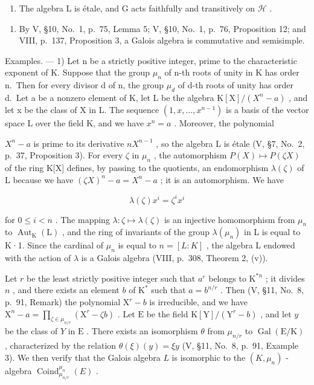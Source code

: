 \begin{enumerate}
\def\labelenumi{(\roman{enumi})}
\setcounter{enumi}{6}
\tightlist
\item
  The algebra \(\mathrm{L}\) is étale, and \(\mathrm{G}\) acts faithfully and transitively on \(\mathcal{H}\) .
\end{enumerate}

\begin{enumerate}
\def\labelenumi{\arabic{enumi})}
\setcounter{enumi}{5}
\tightlist
\item
  By V, §10, No.~1, p.~75, Lemma 5; V, §10, No.~1, p.~76, Proposition 12; and VIII, p.~137, Proposition 3, a Galois algebra is commutative and semisimple.
\end{enumerate}

Examples. --- 1) Let n be a strictly positive integer, prime to the characteristic exponent of K. Suppose that the group \(\mu_{n}\) of n-th roots of unity in K has order n.~Then for every divisor d of n, the group \(\mu_{d}\) of d-th roots of unity has order d.~Let a be a nonzero element of K, let L be the algebra \(\mathrm{K}[\mathrm{X}]/(X^{n}-a)\) , and let x be the class of X in L. The sequence \((1,x,\ldots,x^{n-1})\) is a basis of the vector space L over the field K, and we have \(x^{n}=a\) . Moreover, the polynomial

\(X^{n}-a\) is prime to its derivative \(nX^{n-1}\) , so the algebra L is étale (V, §7, No.~2, p.~37, Proposition 3). For every \(\zeta\) in \(\mu_{n}\) , the automorphism \(P(X)\mapsto P(\zeta X)\) of the ring K{[}X{]} defines, by passing to the quotients, an endomorphism \(\lambda(\zeta)\) of L because we have \((\zeta X)^{n}-a=X^{n}-a\) ; it is an automorphism. We have

\[
\lambda (\zeta) x ^ {i} = \zeta^ {i} x ^ {i}\tag{19}
\]

for \(0 \leqslant i < n\) . The mapping \(\lambda : \zeta \mapsto \lambda(\zeta)\) is an injective homomorphism from \(\mu_{n}\) to \(\operatorname{Aut}_{\mathrm{K}}(\mathrm{L})\) , and the ring of invariants of the group \(\lambda(\mu_{n})\) in L is equal to K·1. Since the cardinal of \(\mu_{n}\) is equal to \(n = [L : K]\) , the algebra L endowed with the action of \(\lambda\) is a Galois algebra (VIII, p.~308, Theorem 2, (v)).

Let \(r\) be the least strictly positive integer such that \(a^r\) belongs to \(\mathrm{K}^{*n}\) ; it divides \(n\) , and there exists an element \(b\) of \(\mathrm{K}^*\) such that \(a = b^{n / r}\) . Then (V, §11, No.~8, p.~91, Remark) the polynomial \(\mathrm{X}^r - b\) is irreducible, and we have \(\mathrm{X}^n - a = \prod_{\zeta \in \mu_{n / r}} (\mathrm{X}^r - \zeta b)\) . Let \(\mathrm{E}\) be the field \(\mathrm{K}[\mathrm{Y}] / (\mathrm{Y}^r - b)\) , and let \(y\) be the class of \(Y\) in \(\mathrm{E}\) . There exists an isomorphism \(\theta\) from \(\mu_{n / r}\) to \(\operatorname{Gal}(\mathrm{E} / \mathrm{K})\) , characterized by the relation \(\theta(\xi)(y) = \xi y\) (V, §11, No.~8, p.~91, Example 3). We then verify that the Galois algebra \(L\) is isomorphic to the \((K, \mu_n)\) -algebra \(\operatorname{Coind}_{\mu_{n / r}}^{\mu_n}(E)\) .

